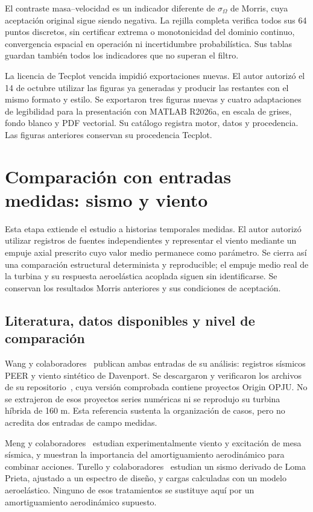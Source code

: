 \documentclass[11pt,a4paper]{article}
\begin{document}
El contraste masa--velocidad es un indicador diferente de $\sigma_\Omega$ de Morris, cuya aceptación original sigue siendo negativa. La rejilla completa verifica todos sus 64 puntos discretos, sin certificar extrema o monotonicidad del dominio continuo, convergencia espacial en operación ni incertidumbre probabilística. Sus tablas guardan también todos los indicadores que no superan el filtro.

La licencia de Tecplot vencida impidió exportaciones nuevas. El autor autorizó el 14 de octubre utilizar las figuras ya generadas y producir las restantes con el mismo formato y estilo. Se exportaron tres figuras nuevas y cuatro adaptaciones de legibilidad para la presentación con MATLAB R2026a, en escala de grises, fondo blanco y PDF vectorial. Su catálogo registra motor, datos y procedencia. Las figuras anteriores conservan su procedencia Tecplot.

\FloatBarrier
\section{Comparación con entradas medidas: sismo y viento}
Esta etapa extiende el estudio a historias temporales medidas. El autor autorizó utilizar registros de fuentes independientes y representar el viento mediante un empuje axial prescrito cuyo valor medio permanece como parámetro. Se cierra así una comparación estructural determinista y reproducible; el empuje medio real de la turbina y su respuesta aeroelástica acoplada siguen sin identificarse. Se conservan los resultados Morris anteriores y sus condiciones de aceptación.

\subsection{Literatura, datos disponibles y nivel de comparación}
Wang y colaboradores~\cite{wang2026inputs} publican ambas entradas de su análisis: registros sísmicos PEER y viento sintético de Davenport. Se descargaron y verificaron los archivos de su repositorio~\cite{diao2026data}, cuya versión comprobada contiene proyectos Origin OPJU. No se extrajeron de esos proyectos series numéricas ni se reprodujo su turbina híbrida de 160 m. Esta referencia sustenta la organización de casos, pero no acredita dos entradas de campo medidas.

Meng y colaboradores~\cite{meng2020} estudian experimentalmente viento y excitación de mesa sísmica, y muestran la importancia del amortiguamiento aerodinámico para combinar acciones. Turello y colaboradores~\cite{turello2023inputs} estudian un sismo derivado de Loma Prieta, ajustado a un espectro de diseño, y cargas calculadas con un modelo aeroelástico. Ninguno de esos tratamientos se sustituye aquí por un amortiguamiento aerodinámico supuesto.
\end{document}

